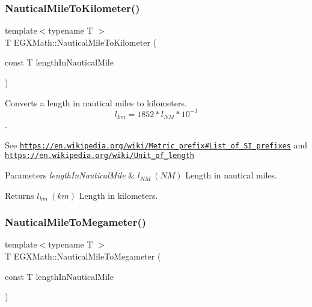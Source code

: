 \subsubsection{\texorpdfstring{Nautical\+Mile\+To\+Kilometer()}{NauticalMileToKilometer()}}
{\footnotesize\ttfamily template$<$typename T $>$ \\
T E\+G\+X\+Math\+::\+Nautical\+Mile\+To\+Kilometer (\begin{DoxyParamCaption}\item[{const T}]{length\+In\+Nautical\+Mile }\end{DoxyParamCaption})}



Converts a length in nautical miles to kilometers. \[ l_{km}=1852 * l_{NM} * 10^{-3} \]. 

See \href{https://en.wikipedia.org/wiki/Metric_prefix#List_of_SI_prefixes}{\tt https\+://en.\+wikipedia.\+org/wiki/\+Metric\+\_\+prefix\#\+List\+\_\+of\+\_\+\+S\+I\+\_\+prefixes} and \href{https://en.wikipedia.org/wiki/Unit_of_length}{\tt https\+://en.\+wikipedia.\+org/wiki/\+Unit\+\_\+of\+\_\+length} 
\begin{DoxyParams}{Parameters}
{\em length\+In\+Nautical\+Mile} & $ l_{NM}\ (NM)$ Length in nautical miles. \\
\hline
\end{DoxyParams}
\begin{DoxyReturn}{Returns}
$ l_{km}\ (km)$ Length in kilometers. 
\end{DoxyReturn}
\mbox{\label{group___e_g_x_math-_conversions-_length_conversions-_non-_s_i-_nautical_mile-_s_i_gabd190340a7a220633ebf73e06cba7e1a}} 
\subsubsection{\texorpdfstring{Nautical\+Mile\+To\+Megameter()}{NauticalMileToMegameter()}}
{\footnotesize\ttfamily template$<$typename T $>$ \\
T E\+G\+X\+Math\+::\+Nautical\+Mile\+To\+Megameter (\begin{DoxyParamCaption}\item[{const T}]{length\+In\+Nautical\+Mile }\end{DoxyParamCaption})}



